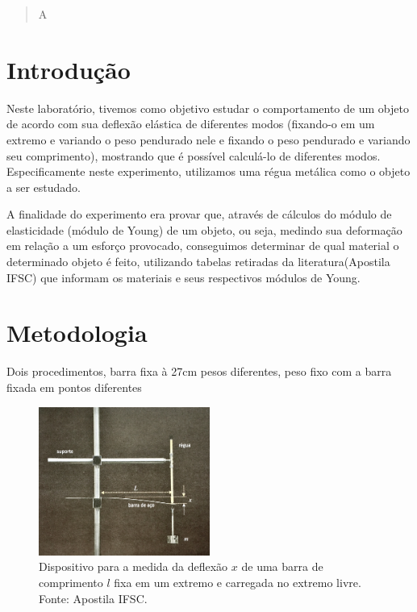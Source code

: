\documentclass{article}
\begin{document}
\begin{abstract}
\indent
A

\end{abstract}
\newpage
\section{Introdução}

\indent

Neste laboratório, tivemos como objetivo estudar o comportamento de um objeto de acordo com sua deflexão elástica de diferentes modos (fixando-o em um extremo e variando o peso pendurado nele e fixando o peso pendurado e variando seu comprimento), mostrando que é possível calculá-lo de diferentes modos. Especificamente neste experimento, utilizamos uma régua metálica como o objeto a ser estudado.

A finalidade do experimento era provar que, através de cálculos do módulo de elasticidade (módulo de Young) de um objeto, ou seja, medindo sua deformação em relação a um esforço provocado, conseguimos determinar de qual material o determinado objeto é feito, utilizando tabelas retiradas da literatura(Apostila IFSC) que informam os materiais e seus respectivos módulos de Young.

\section{Metodologia}

\indent

Dois procedimentos, barra fixa à 27cm pesos diferentes, peso fixo com a barra fixada em pontos diferentes

\begin{figure}[!ht]
    \centering
    \caption{Dispositivo para a medida da deflexão $x$ de uma barra de comprimento $l$ fixa em um extremo e carregada no extremo livre. Fonte: Apostila IFSC.}
    \label{fig:disp}
    \includegraphics[width=0.5\textwidth]{IMG_1472.jpg}
\end{figure}
\end{document}
